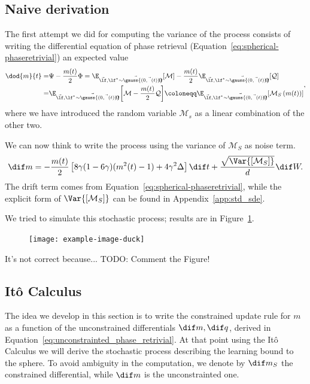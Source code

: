 \subsection{Naive derivation}
The first attempt we did for computing the variance of the process consists of writing 
the differential equation of phase retrieval (Equation~\eqref{eq:spherical-phaseretrivial}) an expected value 
\[\begin{split}
  \dod{m}{t} =& \Psi -\frac{m(t)}{2}\Phi = \E_{\vec{\lf},\vec{\lf^* \sim \gauss{(0,\vec{\Omega}{(t)})}}}{\left[\mathcal{M}\right]} - \frac{m(t)}{2}\E_{\vec{\lf},\vec{\lf^* \sim \gauss{(0,\vec{\Omega}{(t)})}}}{\left[\mathcal{Q}\right]} \\
             =& \E_{\vec{\lf},\vec{\lf^* \sim \gauss{(0,\vec{\Omega}{(t)})}}}{\left[\mathcal{M}-\frac{m(t)}{2}\mathcal{Q}\right]}
             \coloneqq \E_{\vec{\lf},\vec{\lf^* \sim \gauss{(0,\vec{\Omega}{(t)})}}}{\left[\mathcal{M}_S\left({m(t)}\right)\right]}
\end{split},\]
where we have introduced the random variable \(\mathcal{M}_s\) as a linear combination of the other two.

We can now think to write the process using the variance of \(\mathcal{M}_S\) as noise term.
\[
  \dif m = -\frac{m{(t)}}{2}\left[8\gamma(1-6\gamma)(m^2{(t)}-1)+4\gamma^2\Delta\right] \dif t
           + \frac{\sqrt{\Var{\left[\mathcal{M}_S\right]}}}{d}\dif W.
\]
The drift term comes from Equation~\eqref{eq:spherical-phaseretrivial}, while the explicit form of \(\Var{\left[\mathcal{M}_S\right]}\)
can be found in Appendix~\ref{app:std_sde}.

We tried to simulate this stochastic process; results are in Figure~\ref{fig:naive_sde_pr}.
\begin{figure}
  \begin{center}
    \texttt{[image: example-image-duck]}
  \end{center}
  \caption{}
  \label{fig:naive_sde_pr}
\end{figure}
It's not correct because... TODO: Comment the Figure!

\subsection{Itô Calculus}

The idea we develop in this section is to write the constrained update rule for \(m\) as a function of the unconstrained differentials \(\dif m, \dif q\),
derived in Equation~\eqref{eq:unconstrainted_phase_retrivial}.
At that point using the Itô Calculus we will derive the stochastic process describing the learning bound to the sphere.
To avoid ambiguity in the computation, we denote by \(\dif m_S\) the constrained differential, while \(\dif m\) is the unconstrainted one.


